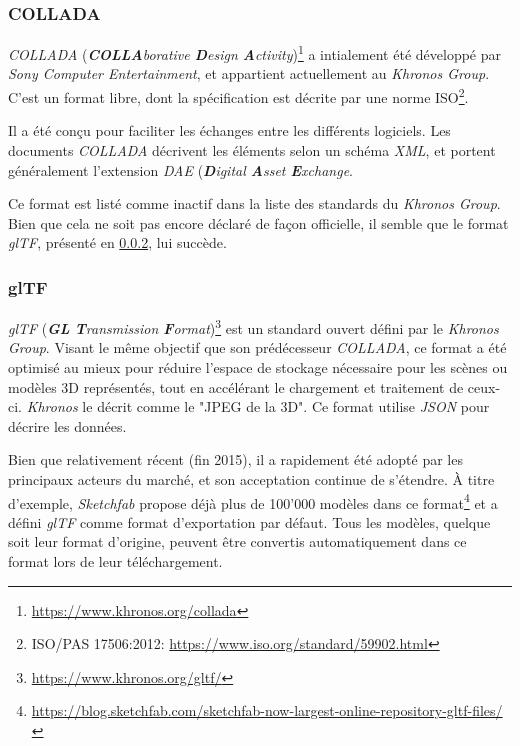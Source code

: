 \subsubsection{COLLADA}
\textit{COLLADA} (\textit{\textbf{COLLA}borative \textbf{D}esign \textbf{A}ctivity})\footnote{\url{https://www.khronos.org/collada}} a intialement été développé par \textit{Sony Computer Entertainment}, et appartient actuellement au \textit{Khronos Group}.
C'est un format libre, dont la spécification est décrite par une norme ISO\footnote{ISO/PAS 17506:2012: \url{https://www.iso.org/standard/59902.html}}.

Il a été conçu pour faciliter les échanges entre les différents logiciels. Les documents \textit{COLLADA} décrivent les éléments selon un schéma \textit{XML}, et portent généralement l'extension \textit{DAE} (\textit{\textbf{D}igital \textbf{A}sset \textbf{E}xchange}.

Ce format est listé comme inactif dans la liste des standards du \textit{Khronos Group}. 
Bien que cela ne soit pas encore déclaré de façon officielle, il semble que le format \textit{glTF}, présenté en \ref{sec:glTF}, lui succède.

\subsubsection{glTF}
\label{sec:glTF}

\textit{glTF} (\textit{\textbf{GL} \textbf{T}ransmission \textbf{F}ormat})\footnote{\url{https://www.khronos.org/gltf/}} est un standard ouvert défini par le \textit{Khronos Group}. Visant le même objectif que son prédécesseur \textit{COLLADA}, ce format a été optimisé au mieux pour réduire l'espace de stockage nécessaire pour les scènes ou modèles 3D représentés, tout en accélérant le chargement et traitement de ceux-ci. 
\textit{Khronos} le décrit comme le "JPEG de la 3D".
Ce format utilise \textit{JSON} pour décrire les données.

Bien que relativement récent (fin 2015), il a rapidement été adopté par les principaux acteurs du marché, et son acceptation continue de s'étendre. À titre d'exemple, \textit{Sketchfab} propose déjà plus de 100'000 modèles dans ce format\footnote{\url{https://blog.sketchfab.com/sketchfab-now-largest-online-repository-gltf-files/}} et a défini \textit{glTF} comme format d'exportation par défaut. Tous les modèles, quelque soit leur format d'origine, peuvent être convertis automatiquement dans ce format lors de leur téléchargement. 

